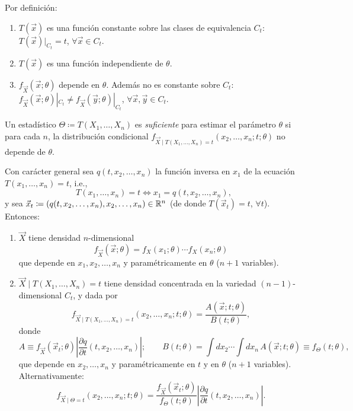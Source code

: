 \begin{observacion}[3 --- Geometría]
Por definición:
\begin{enumerate}
  \item $T(\vec{x})$ es una función constante sobre las clases de equivalencia $C_t$: $T(\vec{x})|_{C_t} = t$, $\forall \vec{x} \in C_t$.
  \item $T(\vec{x})$ es una función independiente de $\theta$.
  \item $f_{\vec{X}}(\vec{x};\theta)$ depende en $\theta$. Además no es constante sobre $C_t$: $f_{\vec{X}}(\vec{x};\theta)|_{C_t} \neq f_{\vec{X}}(\vec{y};\theta)|_{C_t}$, $\forall \vec{x}, \vec{y} \in C_t$.
\end{enumerate}
\end{observacion}

\begin{definicion}[5]
Un estadístico $\Theta \coloneqq T(X_1, \dots, X_n)$ es \emph{suficiente} para estimar el parámetro $\theta$ si para cada $n$, la distribución condicional $f_{\vec{X} \mid T(X_1, \dots, X_n) = t}(x_2, \dots, x_n; t; \theta)$ no depende de $\theta$.
\end{definicion}

\begin{proposicion}[7]
Con carácter general sea $q(t, x_2, \dots, x_n)$ la función inversa en $x_1$ de la ecuación $T(x_1, \dots, x_n) = t$, i.e.,
\[
  T(x_1, \dots, x_n) = t \iff x_1 = q(t, x_2, \dots, x_n),
\]
y sea $\vec{x}_t \coloneqq (q(t, x_2, \dots, x_n), x_2, \dots, x_n) \in \mathbb{R}^n$ (de donde $T(\vec{x}_t) = t$, $\forall t$). Entonces:
\begin{enumerate}
  \item $\vec{X}$ tiene densidad $n$-dimensional
  \[
    f_{\vec{X}}(\vec{x};\theta) = f_X(x_1;\theta)\cdots f_X(x_n;\theta)
  \]
  que depende en $x_1, x_2, \dots, x_n$ y paramétricamente en $\theta$ ($n+1$ variables).
  \item $\vec{X} \mid T(X_1, \dots, X_n) = t$ tiene densidad concentrada en la variedad $(n-1)$-dimensional $C_t$, y dada por
  \[
    f_{\vec{X} \mid T(X_1, \dots, X_n) = t}(x_2, \dots, x_n; t; \theta) = \frac{A(\vec{x}; t; \theta)}{B(t;\theta)},
  \]
  donde
  \[
    A \equiv f_{\vec{X}}(\vec{x}_t;\theta)\left|\frac{\partial q}{\partial t}(t, x_2, \dots, x_n)\right|; \qquad B(t;\theta) = \int dx_2 \cdots \int dx_n \, A(\vec{x}; t; \theta) \equiv f_{\Theta}(t;\theta),
  \]
  que depende en $x_2, \dots, x_n$ y paramétricamente en $t$ y en $\theta$ ($n+1$ variables). Alternativamente:
  \[
    f_{\vec{X} \mid \Theta = t}(x_2, \dots, x_n; t; \theta) = \frac{f_{\vec{X}}(\vec{x}_t;\theta)}{f_{\Theta}(t;\theta)}\left|\frac{\partial q}{\partial t}(t, x_2, \dots, x_n)\right|.
  \]
\end{enumerate}
\end{proposicion}

